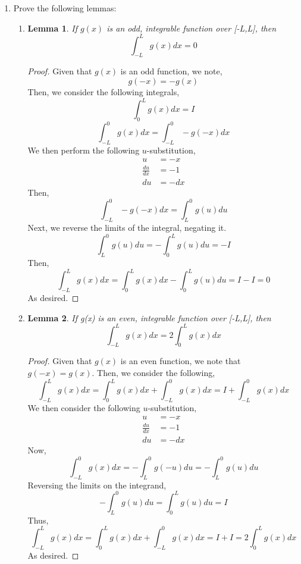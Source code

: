 \documentclass[letterpaper,10pt]{article}
\newtheorem{lem}{Lemma}
\begin{document}
\begin{enumerate}
\item Prove the following lemmas:
\begin{enumerate}
\item \begin{lem}
If $ g(x) $ is an odd, integrable function over [-L,L], then
\[\int_{-L}^{L}g(x)dx=0\]
\end{lem}
\begin{proof}
Given that $g(x)$ is an odd function, we note,
\[g(-x)=-g(x)\]
Then, we consider the following integrals,
\[\int_{0}^{L}g(x)dx=I\]
\[\int_{-L}^{0}g(x)dx=\int_{-L}^{0}-g(-x)dx\]
We then perform the following $u$-substitution,
\begin{align*}
u&=-x\\
\frac{du}{dx}&=-1\\
du&=-dx
\end{align*}
Then,
\[\int_{-L}^{0}-g(-x)dx=\int_{L}^{0}g(u)du\]
Next, we reverse the limits of the integral, negating it.
\[\int_{L}^{0}g(u)du=-\int_{0}^{L}g(u)du=-I\]
Then,
\[\int_{-L}^{L}g(x)dx=\int_{0}^{L}g(x)dx-\int_{0}^{L}g(u)du=I-I=0\]
As desired.
\end{proof}
\item \begin{lem}
If g(x) is an even, integrable function over [-L,L], then
\[\int_{-L}^{L}g(x)dx=2\int_{0}^{L}g(x)dx\]
\end{lem}
\begin{proof}
Given that $g(x)$ is an even function, we note that $g(-x)=g(x)$. Then, we consider the following,
\[\int_{-L}^{L}g(x)dx=\int_{0}^{L}g(x)dx+\int_{-L}^{0}g(x)dx=I+\int_{-L}^{0}g(x)dx\]
We then consider the following $u$-substitution,
\begin{align*}
u&=-x\\
\frac{du}{dx}&=-1\\
du&=-dx
\end{align*}
Now,
\[\int_{-L}^{0}g(x)dx=-\int_{L}^{0}g(-u)du=-\int_{L}^{0}g(u)du\]
Reversing the limits on the integrand,
\[-\int_{L}^{0}g(u)du=\int_{0}^{L}g(u)du=I\]
Thus,
\[\int_{-L}^{L}g(x)dx=\int_{0}^{L}g(x)dx+\int_{-L}^{0}g(x)dx=I+I=2\int_{0}^{L}g(x)dx\]
As desired.
\end{proof}
\end{enumerate}
\end{enumerate}
\end{document}
